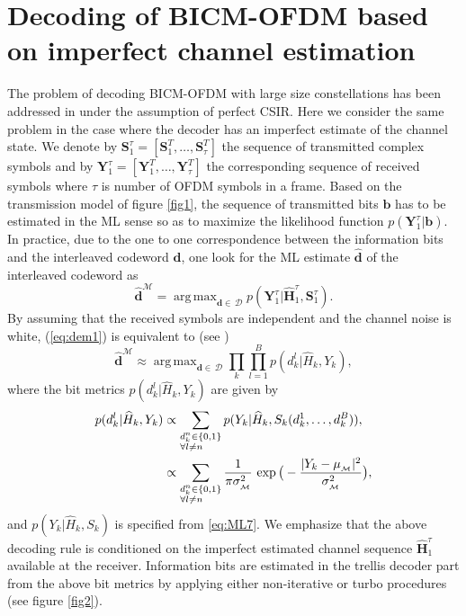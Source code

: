 \documentclass{article}
\def\argmax{\mathop{\mathrm{arg\,max}}} \def\argmin{\mathop{\mathrm{arg\,min}}} \def\Argmax#1#2{\displaystyle \argmax_{#1}\left\{{#2}\right\}} \def\Argmin#1#2{\displaystyle \argmin_{#1}\left\{{#2}\right\}}
\def\Yb{{\mathbf Y}}
\def\Sb{{\mathbf S}}
\def\Hb{{\mathbf H}}
\def\Hh{{\widehat H}}
\begin{document}
\section{Decoding of BICM-OFDM based on imperfect channel estimation}
\label{sec:dem}
The problem of decoding BICM-OFDM with large size constellations has been addressed in \cite{muq1} under the assumption of perfect CSIR. 
Here we consider the same problem in the case where the decoder has an imperfect estimate of the channel state. 
We denote by $\Sb_1^\tau=[\Sb_1^T,\ldots,\Sb_\tau^T]$ the sequence of transmitted complex symbols and by $\Yb_1^\tau=[\Yb_1^T,\ldots,\Yb_\tau^T]$ the corresponding sequence of received symbols where $\tau$ is number of OFDM symbols in a frame.   
Based on the transmission model of figure \ref{fig1}, the sequence of transmitted bits $\mathbf{b}$ has to be estimated in the ML sense so as to maximize the likelihood function $p(\Yb_1^\tau|\mathbf{b})$. In practice, due to the one to one correspondence between the information bits and the interleaved codeword $\mathbf{d}$, one look for the ML estimate $\widehat{\mathbf{d}}$ of the interleaved codeword as
\begin{equation}
\label{eq:dem1}
        \widehat{\mathbf{d}}^{\mathcal{M}}= \argmax_{\mathbf{d} \in \, {\mathscr{D}}} p(\Yb_1^\tau \big| \widehat{\Hb}_1^\tau,\Sb_1^\tau).
\end{equation}    
By assuming that the received symbols are independent and the channel noise is white, (\ref{eq:dem1}) is equivalent to (see \cite{muq1})
\begin{equation}
\label{eq:dem3}
\widehat{\mathbf{d}}^{\mathcal{M}} \approx \argmax_{\mathbf{d} \in \, {\mathscr{D}}} \prod_k \prod_{l=1}^B p(d_k^l|\Hh_k,Y_k),
\end{equation}
where the bit metrics $p(d_k^l|\Hh_k,Y_k)$ are given by
\begin{align}
p(d_k^l|\Hh_k,Y_k) & \propto \sum_{\begin{subarray}{l} d_k^n \in \{0,1\} \\ \forall l \neq n \end{subarray}} p(Y_k|\Hh_k,S_k(d_k^1,\ldots,d_k^B)), \notag \\
    & \propto \sum_{\begin{subarray}{l} d_k^n \in \{0,1\} \\ \forall l \neq n \end{subarray}} \frac{1}{ \pi \sigma^2_{_\mathcal{M}} } \, \exp \big (-\frac{|Y_k-\mu_{_\mathcal{M}}|^2}{\sigma^2_{_\mathcal{M}}} \big),
\end{align}
and $p(Y_k|\Hh_k,S_k)$ is specified from \eqref{eq:ML7}.
We emphasize that the above decoding rule is conditioned on the imperfect estimated channel sequence $\widehat{\Hb}_1^\tau$ available at the receiver. Information bits are estimated in the trellis decoder part from the above bit metrics by applying either non-iterative or turbo procedures (see figure \ref{fig2}).    
\end{document}
